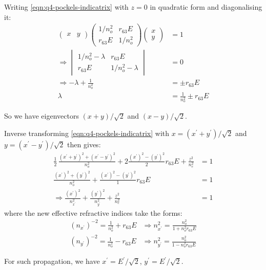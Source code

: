\begin{parts}
	Writing \eqref{eqn:q4-pockels-indicatrix} with $z=0$ in quadratic form and diagonalising it:
	\begin{align*}
		\begin{pmatrix}
			x & y
		\end{pmatrix}
		\begin{pmatrix}
			1/n_o^2 & r_{63}E \\
			r_{63}E & 1/n_o^2
		\end{pmatrix}
		\begin{pmatrix}
			x \\ y
		\end{pmatrix} &= 1 \\
		\Rightarrow \begin{vmatrix}
			1/n_o^2 - \lambda & r_{63}E \\
			r_{63}E & 1/n_o^2 - \lambda
		\end{vmatrix} &= 0 \\
		\Rightarrow -\lambda + \frac{1}{n_o^2} &= \pm r_{63}E \\
		\lambda &= \frac{1}{n_o^2} \pm r_{63}E
	\end{align*}
	
	So we have eigenvectors $(x+y)/\sqrt{2}$ and $(x-y)/\sqrt{2}$.
	
	Inverse transforming \eqref{eqn:q4-pockels-indicatrix} with $x=(x^\prime + y^\prime)/\sqrt{2}$ and $y=(x^\prime - y^\prime)/\sqrt{2}$ then gives:
	\begin{align*}
		\frac{1}{2}\,\frac{(x^\prime + y^\prime)^2 + (x^\prime - y^\prime)^2}{n_o^2} + 2\frac{(x^\prime)^2 - (y^\prime)^2}{2} r_{63}E + \frac{z^2}{n_e^2} &= 1 \\
		\frac{(x^\prime)^2 + (y^\prime)^2}{n_o^2} + \frac{(x^\prime)^2 - (y^\prime)^2}{1} r_{63}E &= 1 \\
		\Rightarrow \frac{(x^\prime)^2}{n_{x^\prime}^2} + \frac{(y^\prime)^2}{n_{y^\prime}^2} + \frac{z^2}{n_e^2} &= 1
	\end{align*}
	where the new effective refractive indices take the forms:
	\begin{align*}
		(n_{x^\prime})^{-2} = \frac{1}{n_o^2} + r_{63}E &\Rightarrow n_{x^\prime}^2 = \frac{n_o^2}{1 + n_o^2 r_{63}E} \\
		(n_{y^\prime})^{-2} = \frac{1}{n_o^2} - r_{63}E &\Rightarrow n_{y^\prime}^2 = \frac{n_o^2}{1 - n_o^2 r_{63}E}
	\end{align*}
	
	For such propagation, we have $x^\prime = E^\prime/\sqrt{2}$, $y^\prime = E^\prime/\sqrt{2}$.
	

\end{parts}
